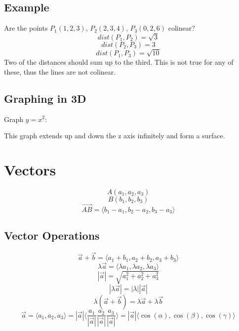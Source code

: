 \documentclass[letterpaper, 12pt]{math}
\begin{document}
\subsection*{Example}
Are the points \( P_{1}(1,2,3) \), \( P_{2}(2,3,4) \), \( P_{3}(0,2,6) \)
colinear?
\[ dist(P_{1},P_{2}) = \sqrt{3} \]
\[ dist(P_{2},P_{3}) = 3 \]
\[ dist(P_{1},P_{3}) = \sqrt{10} \]
Two of the distances should sum up to the third. This is not true for any of
these, thus the lines are not colinear.

\subsection*{Graphing in 3D}
Graph \( y = x^{2} \):
\begin{center}
\end{center}
This graph extends up and down the z axis infinitely and form a surface.

\section*{Vectors}
\[ A(a_{1},a_{2},a_{3}) \]
\[ B(b_{1},b_{2},b_{3}) \]
\[ \vec{AB} = \langle b_{1}-a_{1},b_{2}-a_{2},b_{3}-a_{3}\rangle \]

\subsection*{Vector Operations}
\[ \vec{a}+\vec{b} = \langle a_{1}+b_{1},a_{2}+b_{2},a_{3}+b_{3}\rangle \]
\[ \lambda\vec{a} = \langle\lambda a_{1},\lambda a_{2},\lambda a_{3}\rangle \]
\[ |\vec{a}| = \sqrt{a_{1}^{2}+a_{2}^{2}+a_{3}^{2}} \]
\[ |\lambda\vec{a}| = |\lambda||\vec{a}| \]
\[ \lambda(\vec{a}+\vec{b}) = \lambda\vec{a}+\lambda\vec{b} \]
\[ \vec{a} = \langle a_{1},a_{2},a_{3}\rangle =
  |\vec{a}|\langle\frac{a_{1}}{|\vec{a}|}\frac{a_{2}}{|\vec{a}|}
  \frac{a_{3}}{|\vec{a}|}\rangle =
  |\vec{a}|\langle\cos(\alpha),\cos(\beta),\cos(\gamma)\rangle \]
\end{document}
